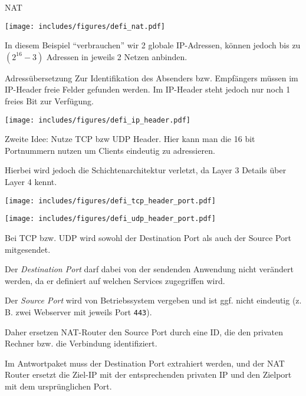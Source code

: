 \begin{example}{NAT}
    \begin{center}
        \texttt{[image: includes/figures/defi\_nat.pdf]}
    \end{center}

    In diesem Beispiel \enquote{verbrauchen} wir 2 globale IP-Adressen, können jedoch bis zu $(2^{16} - 3)$ Adressen in jeweils 2 Netzen anbinden.
\end{example}

\begin{defi}{Adressübersetzung}
    Zur Identifikation des Absenders bzw. Empfängers müssen im IP-Header freie Felder gefunden werden.
    Im IP-Header steht jedoch nur noch 1 freies Bit zur Verfügung.

    \begin{center}
        \texttt{[image: includes/figures/defi\_ip\_header.pdf]}
    \end{center}

    Zweite Idee: Nutze TCP bzw UDP Header.
    Hier kann man die 16 bit Portnummern nutzen um Clients eindeutig zu adressieren.

    Hierbei wird jedoch die Schichtenarchitektur verletzt, da Layer 3 Details über Layer 4 kennt.

    \begin{center}
        \texttt{[image: includes/figures/defi\_tcp\_header\_port.pdf]}

        \texttt{[image: includes/figures/defi\_udp\_header\_port.pdf]}
    \end{center}

    Bei TCP bzw. UDP wird sowohl der Destination Port als auch der Source Port mitgesendet.

    Der \emph{Destination Port} darf dabei von der sendenden Anwendung nicht verändert werden, da er definiert auf welchen Services zugegriffen wird.

    Der \emph{Source Port} wird von Betriebssystem vergeben und ist ggf. nicht eindeutig (z. B. zwei Webserver mit jeweils Port \texttt{443}).

    Daher ersetzen NAT-Router den Source Port durch eine ID, die den privaten Rechner bzw. die Verbindung identifiziert.

    Im Antwortpaket muss der Destination Port extrahiert werden, und der NAT Router ersetzt die Ziel-IP mit der entsprechenden privaten IP und den Zielport mit dem ursprünglichen Port.
\end{defi}

